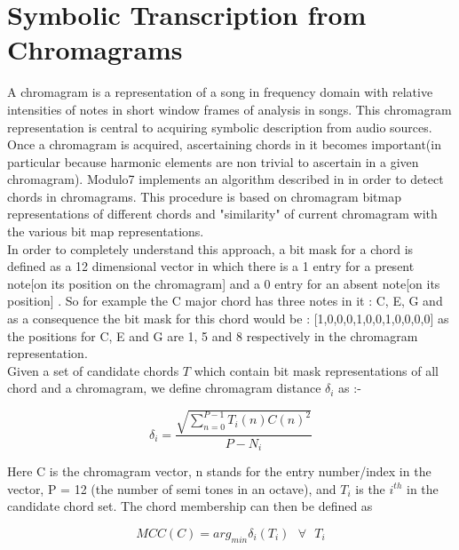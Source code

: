 \section{Symbolic Transcription from Chromagrams} \label{chromagramest}

\noindent A chromagram \cite{chromagramtutorial} is a representation of a song in frequency domain with relative intensities of notes in short window frames of analysis in songs. This chromagram representation is central to acquiring symbolic description from audio sources. Once a chromagram is acquired, ascertaining chords in it becomes important(in particular because harmonic elements are non trivial to ascertain in a given chromagram). Modulo7 implements an algorithm described in \cite{chord-detection} in order to detect chords in chromagrams. This procedure is based on chromagram bitmap representations of different chords and "similarity" of current chromagram with the various bit map representations. \\

\noindent In order to completely understand this approach, a bit mask for a chord is defined as a 12 dimensional vector in which there is a 1 entry for a present note[on its position on the chromagram] and a 0 entry for an absent note[on its position] \cite{chord-detection}. So for example the C major chord has three notes in it : C, E, G and as a consequence the bit mask for this chord would be : [1,0,0,0,1,0,0,1,0,0,0,0] as the positions for C, E and G are 1, 5 and 8 respectively in the chromagram representation. \\

\noindent Given a set of candidate chords $T$ which contain bit mask representations of all chord and a chromagram, we define chromagram distance $\delta_i$ as \cite{chord-detection}:-

\begin{equation}
\delta_i = \frac{\sqrt{\sum_{n = 0}^{P - 1} T_i(n)C(n)^2}}{P - N_i}
\end{equation}

\noindent Here C is the chromagram vector, n stands for the entry number/index in the vector, P = 12 (the number of semi tones in an octave), and $T_i$ is the $i^{th}$ in the candidate chord set. The chord membership can then be defined as 

\begin{equation}
MCC(C) = arg_{min} \delta_i (T_i) \ \ \ \forall \ \ \ T_i
\end{equation}

